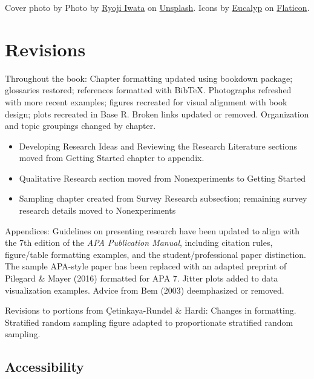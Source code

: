 \documentclass[
]{krantz}
\providecommand{\tightlist}{%
  \setlength{\itemsep}{0pt}\setlength{\parskip}{0pt}}
\begin{document}
Cover photo by Photo by \href{https://unsplash.com/@ryoji__iwata?utm_source=unsplash&utm_medium=referral&utm_content=creditCopyText}{Ryoji Iwata} on \href{https://unsplash.com/@ryoji__iwata?utm_source=unsplash&utm_medium=referral&utm_content=creditCopyText}{Unsplash}. Icons by \href{https://creativemarket.com/eucalyp}{Eucalyp} on \href{https://www.flaticon.com/}{Flaticon}.

\section*{Revisions}\label{revisions}


Throughout the book: Chapter formatting updated using bookdown package; glossaries restored; references formatted with BibTeX. Photographs refreshed with more recent examples; figures recreated for visual alignment with book design; plots recreated in Base R. Broken links updated or removed. Organization and topic groupings changed by chapter.

\begin{itemize}
\tightlist
\item
  Developing Research Ideas and Reviewing the Research Literature sections moved from Getting Started chapter to appendix.
\item
  Qualitative Research section moved from Nonexperiments to Getting Started
\item
  Sampling chapter created from Survey Research subsection; remaining survey research details moved to Nonexperiments
\end{itemize}

Appendices: Guidelines on presenting research have been updated to align with the 7th edition of the \emph{APA Publication Manual}, including citation rules, figure/table formatting examples, and the student/professional paper distinction. The sample APA-style paper has been replaced with an adapted preprint of Pilegard \& Mayer (2016) formatted for APA 7. Jitter plots added to data visualization examples. Advice from Bem (2003) deemphasized or removed.

Revisions to portions from Çetinkaya-Rundel \& Hardi: Changes in formatting. Stratified random sampling figure adapted to proportionate stratified random sampling.

\subsection*{Accessibility}\label{accessibility}
\end{document}
